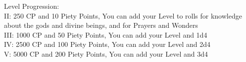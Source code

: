 Level Progression:\\
II: 250 CP and 10 Piety Points, You can add your Level to rolls for knowledge about the gods and divine beings, and for Prayers and Wonders\\
III: 1000 CP and 50 Piety Points, You can add your Level and 1d4\\
IV: 2500 CP and 100 Piety Points, You can add your Level and 2d4\\
V: 5000 CP and 200 Piety Points, You can add your Level and 3d4\\